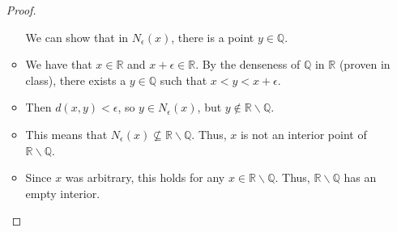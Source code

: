 \documentclass[10pt]{article}
\newcommand{\R}{\mathbb{R}}
\newcommand{\Q}{\mathbb{Q}}
\newenvironment{problem}[2][Problem]{\begin{trivlist}
\item[\hskip \labelsep {\bfseries #1}\hskip \labelsep {\bfseries #2.}]}{\end{trivlist}}
\begin{document}
\begin{problem}{4}
\begin{enumerate}
\begin{proof}
\begin{itemize}
                We can show that in $N_\epsilon(x)$, there is a point $y \in \Q$. 
                    \item
                We have that $x \in \R$ and $x + \epsilon \in \R$. By the denseness of $ \Q $ in $ \R $ (proven in class), there exists a $y \in \Q$ such that $x < y < x + \epsilon$.
                    \item
                Then $d(x, y) < \epsilon$, so $y \in N_\epsilon(x)$, but $y \not\in \R \smallsetminus \Q$.
                    \item
                This means that $N_\epsilon(x) \not\subseteq \R \smallsetminus \Q$.
                Thus, $x$ is not an interior point of $ \R \smallsetminus \Q $.
                    \item
                Since $x$ was arbitrary, this holds for any $x \in \R \smallsetminus \Q$.
                Thus, $ \R \smallsetminus \Q $ has an empty interior.
                \end{itemize}
            \end{proof}
	\end{enumerate}
\end{problem}
\end{document}
